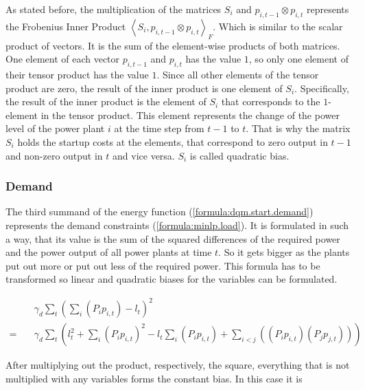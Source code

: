 As stated before, the multiplication of the matrices $S_i$ and $p_{i, t-1} \otimes p_{i, t}$ represents the Frobenius Inner Product $\left\langle S_i, p_{i, t-1} \otimes p_{i, t} \right\rangle_F$.
Which is similar to the scalar product of vectors.
It is the sum of the element-wise products of both matrices.
One element of each vector $p_{i, t-1}$ and $p_{i, t}$ has the value $1$, so only one element of their tensor product has the value $1$.
Since all other elements of the tensor product are zero, the result of the inner product is one element of $S_i$.
Specifically, the result of the inner product is the element of $S_i$ that corresponds to the $1$-element in the tensor product.
This element represents the change of the power level of the power plant $i$ at the time step from $t-1$ to $t$.
That is why the matrix $S_i$ holds the startup costs at the elements, that correspond to zero output in $t-1$ and non-zero output in $t$ and vice versa.
$S_i$ is called quadratic bias.

\subsubsection{Demand}

The third summand of the energy function (\ref{formula:dqm.start.demand}) represents the demand constraints (\ref{formula:minlp.load}).
It is formulated in such a way, that its value is the sum of the squared differences of the required power and the power output of all power plants at time $t$.
So it gets bigger as the plants put out more or put out less of the required power.
This formula has to be transformed so linear and quadratic biases for the variables can be formulated.

\begin{subequations}
\begin{align}
  & \gamma_d \sum_t \left( \sum_i \left( P_i p_{i, t} \right) - l_t \right)^2 \\
  = \quad & \gamma_d \sum_t \left(
    l_t^2
    + \sum_i \left( P_i p_{i, t} \right)^2
    - l_t \sum_i \left( P_i p_{i, t} \right)
    + \sum_{i < j} \left( \left( P_i p_{i, t} \right) \left( P_j p_{j, t} \right) \right) \right)
    \label{formula:dqm.demand.multiplied_out}
\end{align}
\end{subequations}

After multiplying out the product, respectively, the square, everything that is not multiplied with any variables forms the constant bias.
In this case it is

